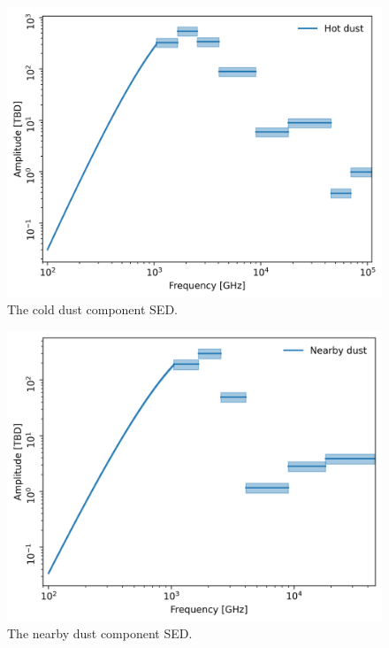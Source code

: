 \documentclass{aa}
\begin{document}
\begin{figure}
  \centering
  \includegraphics[width=\columnwidth]{figures/hot_dust_sed.png}
  \caption{The cold dust component SED.}
  \label{fig:hot_dust_sed}
\end{figure}
\begin{figure}
  \centering
  \includegraphics[width=\columnwidth]{figures/nearby_dust_sed.png}
  \caption{The nearby dust component SED.}
  \label{fig:nearby_dust_sed}
\end{figure}
\end{document}
